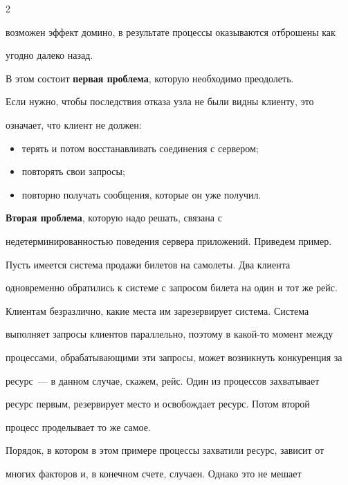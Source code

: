 \begin{multicols}{2}
{возможен эффект домино, в результате процессы оказываются отброшены как

угодно далеко назад.

{ %



}



В этом состоит \textbf{первая проблема}, которую необходимо преодолеть.



Если нужно, чтобы последствия отказа узла не были видны клиенту,  это

означает, что клиент не должен:

\begin{itemize}

\item

терять и потом восстанавливать соединения с сервером;

\item  повторять свои запросы;

\item  повторно получать сообщения, которые он уже получил.

\end{itemize}



\textbf{Вторая проблема}, которую надо решать, связана с

недетерминированностью поведения сервера приложений. Приведем пример.

Пусть имеется сис\-те\-ма продажи билетов на самолеты. Два клиента

одновременно обратились к системе с запросом билета на один и тот же рейс.

Клиентам безразлично, какие места им зарезервирует сис\-тема. Сис\-те\-ма

выполняет запросы клиентов параллельно, поэтому в какой-то момент между

процессами, обрабатывающими эти запросы, может возникнуть конкуренция за

ресурс~--- в данном случае, скажем, рейс. Один из процессов захватывает

ресурс первым, резервирует место и освобождает ресурс. Потом второй

процесс проделывает то же самое.



Порядок, в котором в этом примере процессы захватили ресурс, зависит от

многих факторов и, в конечном счете, случаен. Однако  это не мешает

}
\end{multicols}
